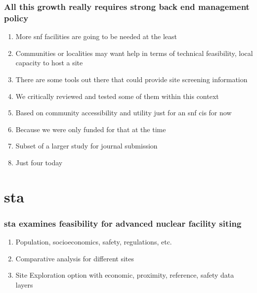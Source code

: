 \documentclass[aspectratio=1610,pdftex,dvipsnames,compress,xcolor={dvipsnames}]{beamer}
\newcommand{\acf}{\acrfull} %
\newcommand{\acs}{\acrshort} %
\begin{document}
\begin{frame}
    \frametitle{All this growth really requires strong back end management policy}
    \begin{enumerate}%
        \item[]More \acs{snf} facilities are going to be needed at the least
        \item[]Communities or localities may want help in terms of technical feasibility, local capacity to host a site
        \item[]There are some tools out there that could provide site screening information
        \item[]We critically reviewed and tested some of them within this context 
        \item[]Based on community accessibility and utility just for an \acs{snf} \acf{cis} for now
        \item[]Because we were only funded for that at the time
        \item[]Subset of a larger study for journal submission
        \item[]Just four today
    \end{enumerate}
\end{frame}


\section{\acf{sta}}


\addtocounter{framenumber}{-1} 
\begin{frame}
    \frametitle{\acs{sta} examines feasibility for advanced nuclear facility siting}
    \begin{enumerate}%
        \item[]Population, socioeconomics, safety, regulations, etc.
        \item[]Comparative analysis for different sites
        \item[]Site Exploration option with economic, proximity, reference, safety data layers
    \end{enumerate}

    \vspace*{\fill}
    \textbf{\tiny\cite{fpz23b}\tiny\hspace{0.05in}}
\end{frame}
\end{document}
